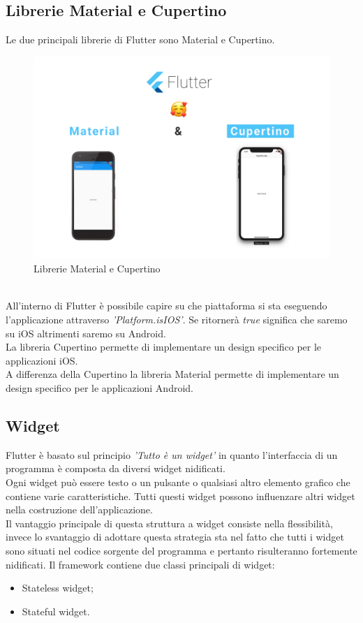 \subsection{Librerie Material e Cupertino}
Le due principali librerie di Flutter sono Material e Cupertino.\\
\begin{figure}[htbp]	
	\centering
	\includegraphics[width=14cm]{immagini/librerieCM.png}
	\caption{Librerie Material e Cupertino}
	\label{fig:Librerie Material e Cupertino}
\end{figure}
\\
All'interno di Flutter è possibile capire su che piattaforma si sta eseguendo l'applicazione attraverso \textit{'Platform.isIOS'}. Se ritornerà \textit{true} significa che saremo su iOS altrimenti saremo su Android.\\
La libreria Cupertino permette di implementare un design specifico per le applicazioni iOS.\\
A differenza della Cupertino la libreria Material permette di implementare un design specifico per le applicazioni Android.

\subsection{Widget}
\label{sec:Widget}
Flutter è basato sul principio \textit{'Tutto è un widget'} in quanto l'interfaccia di un programma è composta da diversi widget nidificati.\\
Ogni widget può essere testo o un pulsante o qualsiasi altro elemento grafico che contiene varie caratteristiche. Tutti questi widget possono influenzare altri widget nella costruzione dell'applicazione.\\
Il vantaggio principale di questa struttura a widget consiste nella flessibilità, invece lo svantaggio di adottare questa strategia sta nel fatto che tutti i widget sono situati nel codice sorgente del programma e pertanto risulteranno fortemente nidificati.
\newpage
Il framework contiene due classi principali di widget:
\begin{itemize}
	\item Stateless widget;   
	\item Stateful widget.
\end{itemize}
\cite{state}

